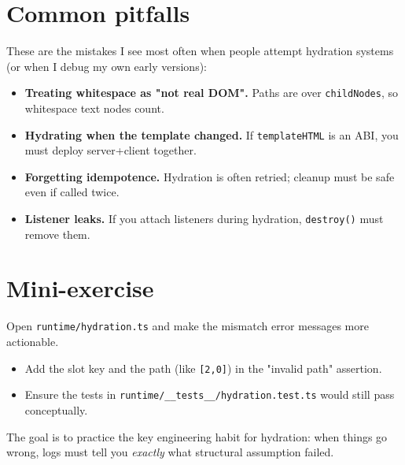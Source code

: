 \section{Common pitfalls}

These are the mistakes I see most often when people attempt hydration systems (or when I debug my own early versions):

\begin{itemize}
  \item \textbf{Treating whitespace as "not real DOM".} Paths are over \texttt{childNodes}, so whitespace text nodes count.
  \item \textbf{Hydrating when the template changed.} If \texttt{templateHTML} is an ABI, you must deploy server+client together.
  \item \textbf{Forgetting idempotence.} Hydration is often retried; cleanup must be safe even if called twice.
  \item \textbf{Listener leaks.} If you attach listeners during hydration, \texttt{destroy()} must remove them.
\end{itemize}

\section{Mini-exercise}

Open \texttt{runtime/hydration.ts} and make the mismatch error messages more actionable.

\begin{itemize}
  \item Add the slot key and the path (like \texttt{[2,0]}) in the "invalid path" assertion.
  \item Ensure the tests in \texttt{runtime/\_\_tests\_\_/hydration.test.ts} would still pass conceptually.
\end{itemize}

The goal is to practice the key engineering habit for hydration: when things go wrong, logs must tell you \emph{exactly} what structural assumption failed.
